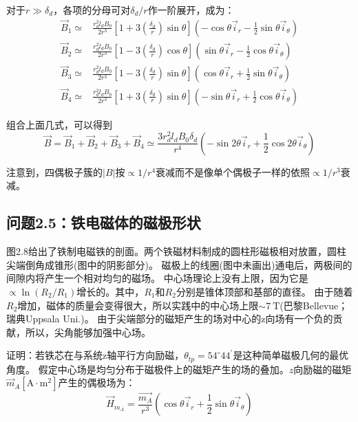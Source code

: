 对于$r\gg \delta_d$，各项的分母可对$\delta_d/r$作一阶展开，成为：
\begin{align}
\vec{B}_1 \simeq& \frac{r_d^2 l_d B_0}{2 r^3}\left[1+3(\frac{\delta_d}{r})\sin\theta \right](-\cos\theta \vec{i}_r-\frac{1}{2}\sin\theta \vec{i}_\theta)\nonumber\tag{S4.3a}\\
\vec{B}_2 \simeq& \frac{r_d^2 l_d B_0}{2 r^3}\left[1-3(\frac{\delta_d}{r})\cos\theta \right](\sin\theta \vec{i}_r-\frac{1}{2}\cos\theta \vec{i}_\theta)\nonumber\tag{S4.3b}\\
\vec{B}_3 \simeq& \frac{r_d^2 l_d B_0}{2 r^3}\left[1-3(\frac{\delta_d}{r})\sin\theta \right](\cos\theta \vec{i}_r+\frac{1}{2}\sin\theta \vec{i}_\theta)\nonumber\tag{S4.3c}\\
\vec{B}_4 \simeq& \frac{r_d^2 l_d B_0}{2 r^3}\left[1+3(\frac{\delta_d}{r})\sin\theta \right](-\sin\theta \vec{i}_r+\frac{1}{2}\cos\theta \vec{i}_\theta)\nonumber\tag{S4.3d}
\end{align}

组合上面几式，可以得到
\begin{equation*}
\vec{B}=\vec{B}_1+\vec{B}_2+\vec{B}_3+\vec{B}_4\simeq \frac{3r_d^2 l_d B_0 \delta_d}{r^4}(-\sin 2\theta \vec{i}_r+\frac{1}{2}\cos 2\theta \vec{i}_\theta) \tag{2.52}
\end{equation*}

注意到，四偶极子簇的$|B|$按$\propto 1/r^4$衰减而不是像单个偶极子一样的依照$\propto 1/r^3$衰减。



\subsection{问题2.5：铁电磁体的磁极形状}
图2.8给出了铁制电磁铁的剖面。两个铁磁材料制成的圆柱形磁极相对放置，圆柱尖端倒角成锥形(图中的阴影部分)。
磁极上的线圈(图中未画出)通电后，两极间的间隙内将产生一个相对均匀的磁场。
中心场理论上没有上限，因为它是$\propto \ln(R_2/R_1)$增长的。其中，$R_1$和$R_2$分别是锥体顶部和基部的直径。
由于随着$R_2$增加，磁体的质量会变得很大，所以实践中的中心场上限$\sim 7\ \mathrm{T}$(巴黎Bellevue；瑞典Uppsala Uni.)。
由于尖端部分的磁矩产生的场对中心的z向场有一个负的贡献，所以，尖角能够加强中心场。

证明：若铁芯在与系统z轴平行方向励磁，$\theta_{tp}=54^\circ 44^\prime$是这种简单磁极几何的最优角度。
假定中心场是均匀分布于磁极件上的磁矩产生的场的叠加。$z$向励磁的磁矩$\vec{m}_A [\mathrm{A\cdot m^2}]$产生的偶极场为：
\begin{equation}
\vec{H}_{m_A}=\frac{\vec{m_A}}{r^3}(\cos\theta \vec{i}_r+\frac{1}{2}\sin\theta\vec{i}_\theta)
\end{equation}

